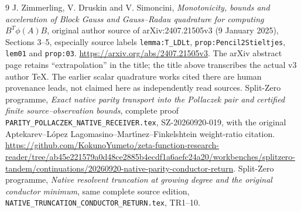 \documentclass[11pt]{article}
\begin{document}
\begin{thebibliography}{9}
 J. Zimmerling, V. Druskin and V. Simoncini,
\emph{Monotonicity, bounds and acceleration of Block Gauss and
Gauss--Radau quadrature for computing $B^T\phi(A)B$}, original
author source of arXiv:2407.21505v3 (9 January 2025),
Sections 3--5, especially source labels
\texttt{lemma:T\_LDLt}, \texttt{prop:Pencil2Stieltjes},
\texttt{lem01} and \texttt{prop:03}.
\url{https://arxiv.org/abs/2407.21505v3}.
The arXiv abstract page retains ``extrapolation'' in the title;
the title above transcribes the actual v3 author TeX.
The earlier scalar quadrature works cited there are human
provenance leads, not claimed here as independently read sources.
 Split-Zero programme, \emph{Exact native parity transport
into the Pollaczek pair and certified finite source--observation bounds},
complete proof \texttt{PARITY\_POLLACZEK\_NATIVE\_RECEIVER.tex},
SZ-20260920-019, with the original Aptekarev--L\'opez
Lagomasino--Mart\'{\i}nez--Finkelshtein weight-ratio citation.
\url{https://github.com/KokunoYumeto/zeta-function-research-reader/tree/ab45e221579a0d48ce2885b4ecdf1a6aefc24a20/workbenches/splitzero-tandem/continuations/20260920-native-parity-conductor-return}.
 Split-Zero programme, \emph{Native resolvent truncation at
growing degree and the original conductor minimum}, same complete
source edition, \texttt{NATIVE\_TRUNCATION\_CONDUCTOR\_RETURN.tex}, TR1--10.
\end{thebibliography}
\end{document}
